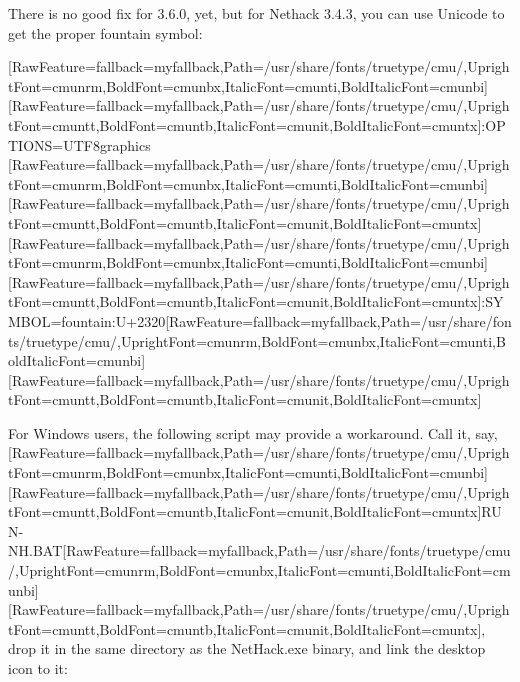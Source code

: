 There is no good fix for 3.6.0, yet, but for Nethack 3.4.3, you can use Unicode to get the proper fountain symbol:


{\ttfamily \allowbreak{}\setmainfont{cmuntt.ttf}[RawFeature={fallback=myfallback},Path=/usr/share/fonts/truetype/cmu/,UprightFont=cmunrm,BoldFont=cmunbx,ItalicFont=cmunti,BoldItalicFont=cmunbi]\setmonofont{cmuntt.ttf}[RawFeature={fallback=myfallback},Path=/usr/share/fonts/truetype/cmu/,UprightFont=cmuntt,BoldFont=cmuntb,ItalicFont=cmunit,BoldItalicFont=cmuntx]\ttfamily :OPTIONS=UTF8graphics}$\text{ }$\newline{}
\allowbreak{}\setmainfont{cmunrm.ttf}[RawFeature={fallback=myfallback},Path=/usr/share/fonts/truetype/cmu/,UprightFont=cmunrm,BoldFont=cmunbx,ItalicFont=cmunti,BoldItalicFont=cmunbi]\setmonofont{cmunrm.ttf}[RawFeature={fallback=myfallback},Path=/usr/share/fonts/truetype/cmu/,UprightFont=cmuntt,BoldFont=cmuntb,ItalicFont=cmunit,BoldItalicFont=cmuntx]
{\ttfamily \allowbreak{}\setmainfont{cmuntt.ttf}[RawFeature={fallback=myfallback},Path=/usr/share/fonts/truetype/cmu/,UprightFont=cmunrm,BoldFont=cmunbx,ItalicFont=cmunti,BoldItalicFont=cmunbi]\setmonofont{cmuntt.ttf}[RawFeature={fallback=myfallback},Path=/usr/share/fonts/truetype/cmu/,UprightFont=cmuntt,BoldFont=cmuntb,ItalicFont=cmunit,BoldItalicFont=cmuntx]\ttfamily :SYMBOL=\textquotesingle{}fountain\textquotesingle{}:U+2320}\allowbreak{}\setmainfont{cmunrm.ttf}[RawFeature={fallback=myfallback},Path=/usr/share/fonts/truetype/cmu/,UprightFont=cmunrm,BoldFont=cmunbx,ItalicFont=cmunti,BoldItalicFont=cmunbi]\setmonofont{cmunrm.ttf}[RawFeature={fallback=myfallback},Path=/usr/share/fonts/truetype/cmu/,UprightFont=cmuntt,BoldFont=cmuntb,ItalicFont=cmunit,BoldItalicFont=cmuntx]


For Windows users, the following script may provide a workaround. Call it, say, {\ttfamily \allowbreak{}\setmainfont{cmuntt.ttf}[RawFeature={fallback=myfallback},Path=/usr/share/fonts/truetype/cmu/,UprightFont=cmunrm,BoldFont=cmunbx,ItalicFont=cmunti,BoldItalicFont=cmunbi]\setmonofont{cmuntt.ttf}[RawFeature={fallback=myfallback},Path=/usr/share/fonts/truetype/cmu/,UprightFont=cmuntt,BoldFont=cmuntb,ItalicFont=cmunit,BoldItalicFont=cmuntx]\ttfamily RUN-{}NH.BAT}\allowbreak{}\setmainfont{cmunrm.ttf}[RawFeature={fallback=myfallback},Path=/usr/share/fonts/truetype/cmu/,UprightFont=cmunrm,BoldFont=cmunbx,ItalicFont=cmunti,BoldItalicFont=cmunbi]\setmonofont{cmunrm.ttf}[RawFeature={fallback=myfallback},Path=/usr/share/fonts/truetype/cmu/,UprightFont=cmuntt,BoldFont=cmuntb,ItalicFont=cmunit,BoldItalicFont=cmuntx], drop it in the same directory as the NetHack.exe binary, and link the desktop icon to it:



